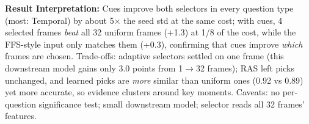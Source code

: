 \documentclass[8pt,a4paper]{article}
\begin{document}
\vspace{-5pt}

\textbf{Result Interpretation:}
Cues improve both selectors in every question type (most: Temporal) by about 5$\times$ the seed std at the same cost; with cues, 4 selected frames \emph{beat} all 32 uniform frames (+1.3) at 1/8 of the cost, while the FFS-style input only matches them (+0.3), confirming that cues improve \emph{which} frames are chosen. Trade-offs: adaptive selectors settled on one frame (this downstream model gains only 3.0 points from 1$\to$32 frames); RAS left picks unchanged, and learned picks are \emph{more} similar than uniform ones (0.92 vs 0.89) yet more accurate, so evidence clusters around key moments. Caveats: no per-question significance test; small downstream model; selector reads all 32 frames' features.
\end{document}
